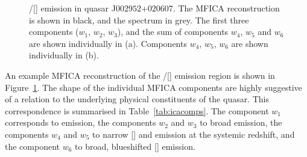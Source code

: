 \begin{figure}[t!]
   \captionsetup[subfigure]{labelformat=empty}
    \centering
    \subfloat[\label{fig:mfica_components_a}]{}
    \subfloat[\label{fig:mfica_components_b}]{}
    \caption[{MFICA reconstruction of the \hbns/[] emission in quasar J$002952$+$020607$.}]{\hbns/[] emission in quasar J$002952$+$020607$. The MFICA reconstruction is shown in black, and the spectrum in grey. The first three components ($w_1$, $w_2$, $w_3$), and the sum of components $w_4$, $w_5$ and $w_6$ are shown individually in (a). Components $w_4$, $w_5$, $w_6$ are shown individually in (b).}     
    \label{fig:mfica_components}
\end{figure}

An example MFICA reconstruction of the \hbns/[] emission region is shown in Figure~\ref{fig:mfica_components}. 
The shape of the individual MFICA components are highly suggestive of a relation to the underlying physical constituents of the quasar. 
This correspondence is summarised in Table~\ref{tab:icacomps}. 
The component $w_1$ corresponds to  emission, the components $w_2$ and $w_3$ to broad \hb emission, the components $w_4$ and $w_5$ to narrow [] and \hb emission at the systemic redshift, and the component $w_6$ to broad, blueshifted [] emission. 

